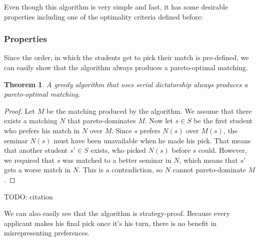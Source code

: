 Even though this algorithm is very simple and fast, it has some desirable properties including one of the optimality criteria defined before:

\subsubsection{Properties}
Since the order, in which the students get to pick their match is pre-defined, we can easily show that the algorithm always produces a pareto-optimal matching.
\newtheorem{theorem}{Theorem}
\begin{theorem}
    A greedy algorithm that uses serial dictatorship always produces a pareto-optimal matching.
\end{theorem}
\begin{proof}
    Let $M$ be the matching produced by the algorithm. We assume that there exists a matching $N$ that pareto-dominates $M$. Now let $s\in S$ be the first student who prefers his match in $N$ over $M$. Since $s$ prefers $N(s)$ over $M(s)$, the seminar $N(s)$ must have been unavailable when he made his pick. That means that another student $s' \in S$ exists, who picked $N(s)$ before $s$ could. However, we required that $s$ was matched to a better seminar in $N$, which means that $s'$ gets a worse match in $N$. This is a contradiction, so $N$ cannot pareto-dominate $M$.
\end{proof} TODO: citation

We can also easily see that the algorithm is strategy-proof. \cite{Klaus} Because every applicant makes his final pick once it's his turn, there is no benefit in misrepresenting preferences.

